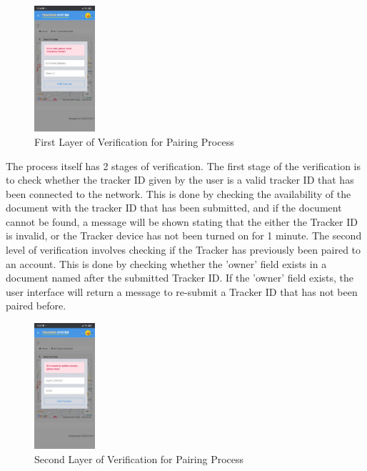 \documentclass[conference]{IEEEtran}
\begin{document}
\begin{figure}[htbp]
    \centering
    \includegraphics[width=0.2\textwidth]{pairingfail1}
    \caption{First Layer of Verification for Pairing Process}
    \label{fig1}
\end{figure}
The process itself has 2 stages of verification. The first stage of the verification is to check whether the tracker ID given by the user is a valid tracker ID that has been connected to the network. This is done by checking the availability 
of the document with the tracker ID that has been submitted, and if the document cannot be found, a message will be shown stating that the either the Tracker ID is invalid, or the Tracker device has not been turned on for 1 minute. The second level 
of verification involves checking if the Tracker has previously been paired to an account. This is done by checking whether the 'owner' field exists in a document named after the submitted Tracker ID. If the 'owner' field exists, the user interface will return a message 
to re-submit a Tracker ID that has not been paired before. 
\begin{figure}[htbp]
    \centering
    \includegraphics[width=0.2\textwidth]{pairingfail2}
    \caption{Second Layer of Verification for Pairing Process}
    \label{fig1}
\end{figure}
\end{document}
